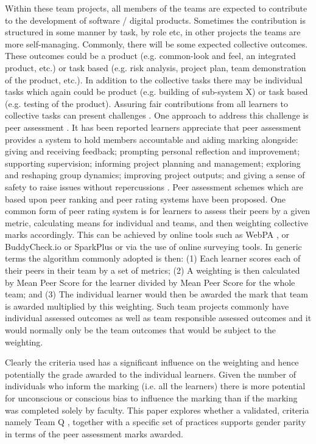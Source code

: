 \documentclass[sigconf, anonymous=true]{acmart}
\begin{document}
Within these team projects, all members of the teams are expected to contribute to the  development of software / digital products. Sometimes the contribution is structured in some manner by task, by role etc, in other projects the teams are more self-managing. Commonly, there will be some expected collective outcomes. These outcomes could be a product (e.g. common-look and feel, an integrated product, etc.) or task based (e.g. risk analysis, project plan, team demonstration of the product, etc.).  In addition to the collective tasks there may be individual tasks which again could be product (e.g. building of sub-system X) or task based (e.g. testing of the product). Assuring fair contributions from all learners to collective tasks can present challenges \cite{Philips21}. One approach to address this challenge is peer assessment \cite{Gordon2010}. It has been reported learners appreciate that peer assessment provides a system to hold members accountable and  aiding marking alongside: giving and receiving feedback; prompting personal reflection and improvement; supporting supervision; informing project planning and management; exploring and reshaping group dynamics; improving project outputs; and giving a sense of safety to raise issues without repercussions \cite{Mitchell2021}.   Peer assessment schemes which are based upon peer ranking  and peer rating systems \cite{Yanbin2005} have been proposed. One common form of peer rating system is for learners to assess their peers by a given metric, calculating means for individual and teams, and then weighting collective marks accordingly. This can be achieved by online tools such as WebPA \cite{WebPA}, or BuddyCheck.io \cite{BuddyCheck} or SparkPlus \cite{SparkPlus} or via the use of online surveying tools. In generic terms the algorithm commonly adopted is then: (1) Each learner scores each of their peers in their team by a set of metrics; (2) A weighting is then calculated by Mean Peer Score for the learner divided by Mean Peer Score for the whole team; and (3) The individual learner would then be awarded the mark that team is awarded multiplied by this weighting. Such team projects commonly have individual assessed outcomes as well as team responsible assessed outcomes and it would normally only be the team outcomes that would be subject to the weighting.

Clearly the criteria used has a significant influence on the weighting and hence potentially the grade awarded to the individual learners.  Given the number of individuals who inform the marking (i.e. all the learners) there is more potential for unconscious or conscious bias to influence the marking than if the marking was completed solely by faculty. This paper explores whether a validated, criteria namely Team Q \cite{Britton2017}, together with a specific set of practices supports gender parity in terms of the peer assessment marks awarded. 
  
\end{document}

